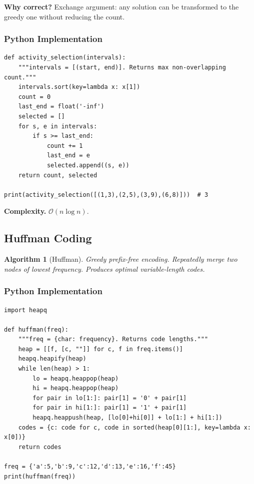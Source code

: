 \documentclass[10pt,a4paper]{article}
\theoremstyle{cpstyle}
\newtheorem{algorithm}[theorem]{Algorithm}
\newcommand{\bigO}[1]{\mathcal{O}\!\left(#1\right)}
\begin{document}
\textbf{Why correct?} Exchange argument: any solution can be transformed to the greedy one without reducing the count.

\subsubsection{Python Implementation}
\begin{lstlisting}[caption={Activity Selection -- maximum non-overlapping intervals}]
def activity_selection(intervals):
    """intervals = [(start, end)]. Returns max non-overlapping count."""
    intervals.sort(key=lambda x: x[1])
    count = 0
    last_end = float('-inf')
    selected = []
    for s, e in intervals:
        if s >= last_end:
            count += 1
            last_end = e
            selected.append((s, e))
    return count, selected

print(activity_selection([(1,3),(2,5),(3,9),(6,8)]))  # 3
\end{lstlisting}

\textbf{Complexity.} $\bigO{n \log n}$.

\subsection{Huffman Coding}

\begin{algorithm}[Huffman]
Greedy prefix-free encoding. Repeatedly merge two nodes of lowest frequency. Produces optimal variable-length codes.
\end{algorithm}

\subsubsection{Python Implementation}
\begin{lstlisting}[caption={Huffman Coding}]
import heapq

def huffman(freq):
    """freq = {char: frequency}. Returns code lengths."""
    heap = [[f, [c, ""]] for c, f in freq.items()]
    heapq.heapify(heap)
    while len(heap) > 1:
        lo = heapq.heappop(heap)
        hi = heapq.heappop(heap)
        for pair in lo[1:]: pair[1] = '0' + pair[1]
        for pair in hi[1:]: pair[1] = '1' + pair[1]
        heapq.heappush(heap, [lo[0]+hi[0]] + lo[1:] + hi[1:])
    codes = {c: code for c, code in sorted(heap[0][1:], key=lambda x: x[0])}
    return codes

freq = {'a':5,'b':9,'c':12,'d':13,'e':16,'f':45}
print(huffman(freq))
\end{lstlisting}
\end{document}
